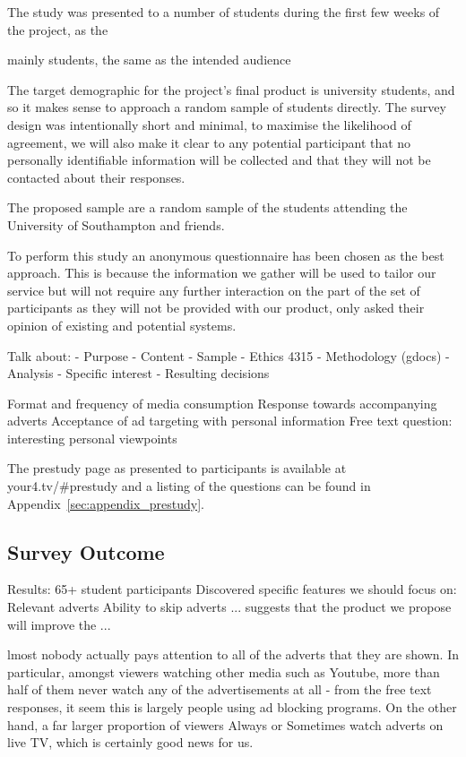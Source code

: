 The study was presented to a number of students during the first few weeks of the project, as the 

mainly students, the same as the intended audience


The target demographic for the project's final product is university students, and so it makes sense to approach a random sample of students directly. The survey design was intentionally short and minimal, to maximise the likelihood of agreement, we will also make it clear to any potential participant that no personally identifiable information will be collected and that they will not be contacted about their responses. %

The proposed sample are a random sample of the students attending the University of Southampton and friends.


To perform this study an anonymous questionnaire has been chosen as the best approach. This is because the information we gather will be used to tailor our service but will not require any further interaction on the part of the set of participants as they will not be provided with our product, only asked their opinion of existing and potential systems.



Talk about:
 - Purpose
 - Content
 - Sample
 - Ethics 4315
 - Methodology (gdocs)
 - Analysis
  - Specific interest
  - Resulting decisions


Format and frequency of media consumption
Response towards accompanying adverts
Acceptance of ad targeting with personal information
Free text question: interesting personal viewpoints





The prestudy page as presented to participants is available at your4.tv/\#prestudy and a listing of the questions can be found in Appendix~\ref{sec:appendix_prestudy}. %


\subsection{Survey Outcome}

Results:
65+ student participants
Discovered specific features we should  focus on:
Relevant adverts
Ability to skip adverts
... suggests that the product we propose will improve the ...

lmost nobody actually pays attention to all of the adverts that they are shown. In particular, amongst viewers watching other media such as Youtube, more than half of them never watch any of the advertisements at all - from the free text responses, it seem this is largely people using ad blocking programs. On the other hand, a far larger proportion of viewers Always or Sometimes watch adverts on live TV, which is certainly good news for us.

